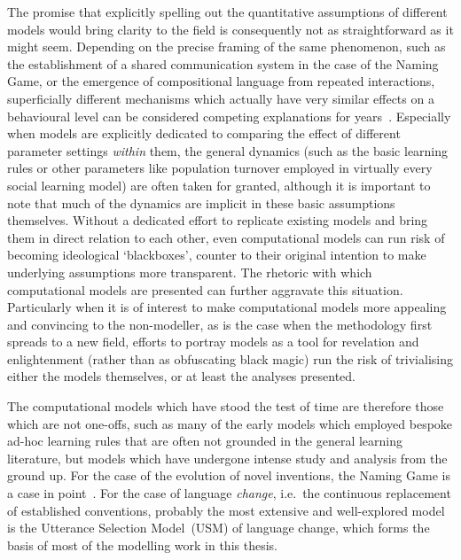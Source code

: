 The promise that explicitly spelling out the quantitative assumptions of different models would bring clarity to the field is consequently not as straightforward as it might seem. Depending on the precise framing of the same phenomenon, such as the establishment of a shared communication system in the case of the Naming Game, or the emergence of compositional language from repeated interactions, superficially different mechanisms which actually have very similar effects on a behavioural level can be considered competing explanations for years~\citep{Wellens2012,Spike2016}.
Especially when models are explicitly dedicated to comparing the effect of different parameter settings \emph{within} them, the general dynamics (such as the basic learning rules or other parameters like population turnover employed in virtually every social learning model) are often taken for granted, although it is important to note that much of the dynamics are implicit in these basic assumptions themselves.
Without a dedicated effort to replicate existing models and bring them in direct relation to each other, even computational models can run risk of becoming ideological `blackboxes', counter to their original intention to make underlying assumptions more transparent.
The rhetoric with which computational models are presented can further aggravate this situation. Particularly when it is of interest to make computational models more appealing and convincing to the non-modeller, as is the case when the methodology first spreads to a new field, efforts to portray models as a tool for revelation and enlightenment (rather than as obfuscating black magic) run the risk of trivialising either the models themselves, or at least the analyses presented. %

The computational models which have stood the test of time are therefore those which are not one-offs, such as many of the early models which employed bespoke ad-hoc learning rules that are often not grounded in the general learning literature, but models which have undergone intense study and analysis from the ground up. For the case of the evolution of novel inventions, the Naming Game is a case in point~\citep{Baronchelli2008}. For the case of language \emph{change}, i.e.~the continuous replacement of established conventions, probably the most extensive and well-explored model is the Utterance Selection Model~(USM) of language change, which forms the basis of most of the modelling work in this thesis.

